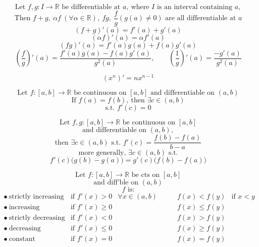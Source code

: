 \documentclass[11pt]{article}
\begin{document}

\[
\text{Let } f,g:I\to\mathbb R \text{ be differentiable at } a,\ \text{where } I \text{ is an interval containing } a,
\]
\[
\text{Then } f+g,\ \alpha f\ (\forall\alpha\in\mathbb R),\ fg,\ \frac{f}{g}(g(a)\ne0)
\text{ are all differentiable at } a
\]
\[
(f+g)'(a)=f'(a)+g'(a)
\]
\[
(\alpha f)'(a)=\alpha f'(a)
\]
\[
(fg)'(a)=f'(a)g(a)+f(a)g'(a)
\]
\[
\left(\frac{f}{g}\right)'(a)=
\frac{f'(a)g(a)-f(a)g'(a)}{g^2(a)},
\qquad
\left(\frac{1}{g}\right)'(a)=\frac{-g'(a)}{g^2(a)}
\]


\[
(x^n)'=nx^{n-1}
\]

\newpage



\[
\text{Let } f:[a,b]\to\mathbb R \text{ be continuous on } [a,b] \text{ and differentiable on } (a,b)
\]
\[
\text{If } f(a)=f(b),\ \text{then } \exists c\in(a,b)
\]
\[
\text{s.t. } f'(c)=0
\]


\[
\text{Let } f,g:[a,b]\to\mathbb R \text{ be continuous on } [a,b]
\]
\[
\text{and differentiable on } (a,b),
\]
\[
\text{then } \exists c\in(a,b) \text{ s.t. } f'(c)=\frac{f(b)-f(a)}{b-a}
\]
\[
\text{more generally, } \exists c\in(a,b) \text{ s.t.}
\]
\[
f'(c)\bigl(g(b)-g(a)\bigr)=g'(c)\bigl(f(b)-f(a)\bigr)
\]


\[
\text{Let } f:[a,b]\to\mathbb R \text{ be cts on } [a,b]
\]
\[
\text{and diff'ble on } (a,b)
\]
\[
f\text{ is:}
\]
\[
\begin{array}{lll}
\bullet\ \text{strictly increasing} & \text{if } f'(x)>0 & \forall x\in(a,b)\\
\bullet\ \text{increasing} & \text{if } f'(x)\ge0 &\\
\bullet\ \text{strictly decreasing} & \text{if } f'(x)<0 &\\
\bullet\ \text{decreasing} & \text{if } f'(x)\le0 &\\
\bullet\ \text{constant} & \text{if } f'(x)=0 &
\end{array}
\qquad
\begin{array}{ll}
f(x)<f(y) & \text{if } x<y\\
f(x)\le f(y) &\\
f(x)>f(y) &\\
f(x)\ge f(y) &\\
f(x)=f(y) &
\end{array}
\]
\end{document}

